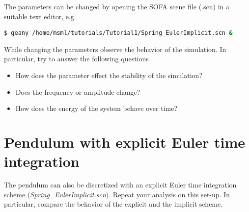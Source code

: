 The parameters can be changed by opening the SOFA scene file (.scn) in a suitable text editor, e.g.
\begin{lstlisting}[language=sh, breaklines=true]
$ geany /home/msml/tutorials/Tutorial1/Spring_EulerImplicit.scn &
\end{lstlisting}

While changing the parameters observe the behavior of the simulation. In particular, try to answer the following questions
\begin{itemize}
	\item How does the parameter effect the stability of the simulation?
	\item Does the frequency or amplitude change?
	\item How does the energy of the system behave over time?
\end{itemize}

\section{Pendulum with explicit Euler time integration}

The pendulum can also be discretized with an explicit Euler time integration scheme (\emph{Spring\_EulerImplicit.scn}). Repeat your analysis on this set-up. In particular, compare the behavior of the explicit and the implicit scheme. 
